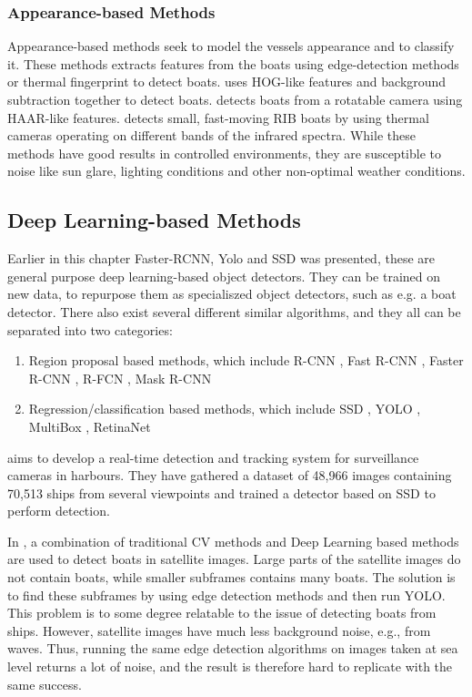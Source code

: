 \subsubsection{Appearance-based Methods}
Appearance-based methods seek to model the vessels appearance and to classify it. These methods extracts features from the boats using edge-detection methods or thermal fingerprint to detect boats. \citep{HOGdetection} uses HOG-like features and background subtraction together to detect boats. \citep{HAARdetection} detects boats from a rotatable camera using HAAR-like features. \citep{RIBDetection} detects small, fast-moving RIB boats by using thermal cameras operating on different bands of the infrared spectra. While these methods have good results in controlled environments, they are susceptible to noise like sun glare, lighting conditions and other non-optimal weather conditions. 


\subsection{Deep Learning-based Methods}
Earlier in this chapter Faster-RCNN, Yolo and SSD was presented, these are general purpose deep learning-based object detectors. They can be trained on new data, to repurpose them as specialiszed object detectors, such as e.g. a boat detector. There also exist several different similar algorithms, and they all can be separated into two categories:

\begin{enumerate}
\item Region proposal based methods, which include R-CNN \citep{R-CNN}, Fast R-CNN \citep{FastR-CNN}, Faster R-CNN \citep{FasterR-CNN}, R-FCN \citep{R-FCN}, Mask R-CNN \citep{MaskRCNN}
\item Regression/classification based methods, which include SSD \citep{SSD}, YOLO \citep{YOLOv1} \citep{YOLOv2} \citep{YOLOv3}, MultiBox \citep{Multibox}, RetinaNet \citep{Retinanet}
\end{enumerate}


\citep{SSD_detection2018} aims to develop a real-time detection and tracking system for surveillance cameras in harbours. They have gathered a dataset of 48,966 images containing 70,513 ships from several viewpoints and trained a detector based on SSD \citep{SSD} to perform detection. 

\vspace{3mm}

In \citep{VanEtten2018}, a combination of traditional CV methods and Deep Learning based methods are used to detect boats in satellite images. Large parts of the satellite images do not contain boats, while smaller subframes contains many boats. The solution is to find these subframes by using edge detection methods and then run YOLO. This problem is to some degree relatable to the issue of detecting boats from ships. However, satellite images have much less background noise, e.g., from waves. Thus, running the same edge detection algorithms on images taken at sea level returns a lot of noise, and the result is therefore hard to replicate with the same success.

